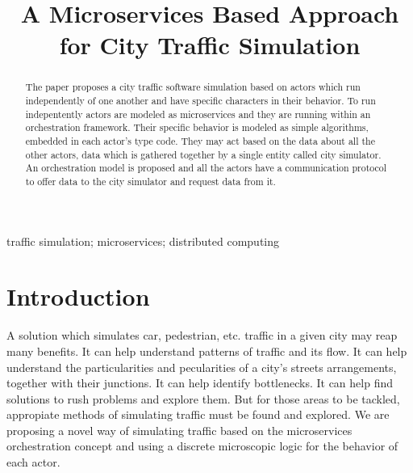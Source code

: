 \documentclass[conference]{IEEEtran}
\begin{document}
\title{A Microservices Based Approach for City Traffic Simulation}

\author{
    \and
}

\maketitle

\begin{abstract}

The paper proposes a city traffic software simulation based on actors which run independently of one another and have specific characters in their behavior. To run indepentently actors are modeled as microservices and they are running within an orchestration framework. Their specific behavior is modeled as simple algorithms, embedded in each actor's type code. They may act based on the data about all the other actors, data which is gathered together by a single entity called city simulator. An orchestration model is proposed and all the actors have a communication protocol to offer data to the city simulator and request data from it. 

\end{abstract}

\begin{IEEEkeywords}
  traffic simulation; microservices; distributed computing
\end{IEEEkeywords}

\section{Introduction}

A solution which simulates car, pedestrian, etc. traffic in a given city may reap many benefits. It can help understand patterns of traffic and its flow. It can help understand the particularities and pecularities of a city's streets arrangements, together with their junctions. It can help identify bottlenecks. It can help find solutions to rush problems and explore them. But for those areas to be tackled, appropiate methods of simulating traffic must be found and explored. We are proposing a novel way of simulating traffic based on the microservices orchestration concept and using a discrete microscopic logic for the behavior of each actor.
\end{document}
